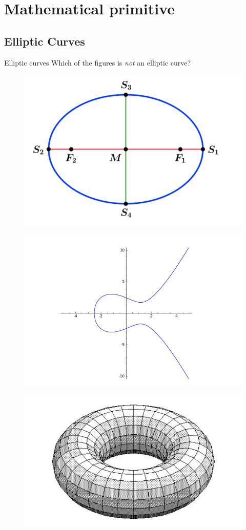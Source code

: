 \documentclass{beamer}
\begin{document}
\section{Mathematical primitive}

\subsection{Elliptic Curves}

\begin{frame}{Elliptic curves}
	Which of the figures is \textit{not} an elliptic curve?
	\begin{figure}
		\begin{minipage}{0.48\textwidth}
			\centering
			\includegraphics[width=.7\linewidth]{ellipse}
			\label{fig:ellipse}
		\end{minipage}\hfill
		\begin{minipage}{0.48\textwidth}
			\centering
			\includegraphics[width=.7\linewidth]{elliptic_curve}
			\label{fig:elliptic_curve}
		\end{minipage}
	\end{figure}
	\begin{figure}
	\begin{minipage}{0.48\textwidth}
		\centering
		\includegraphics[width=.7\linewidth]{elliptic_curve_c}

\end{minipage}
\end{figure}
\end{frame}
\end{document}
